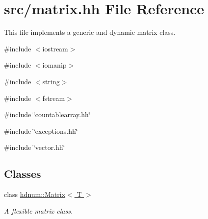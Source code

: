 \hypertarget{matrix_8hh}{
\section{src/matrix.hh File Reference}
\label{matrix_8hh}
}


This file implements a generic and dynamic matrix class.  


{\ttfamily \#include $<$iostream$>$}\par
{\ttfamily \#include $<$iomanip$>$}\par
{\ttfamily \#include $<$string$>$}\par
{\ttfamily \#include $<$fstream$>$}\par
{\ttfamily \#include \char`\"{}countablearray.hh\char`\"{}}\par
{\ttfamily \#include \char`\"{}exceptions.hh\char`\"{}}\par
{\ttfamily \#include \char`\"{}vector.hh\char`\"{}}\par
\subsection*{Classes}
\begin{DoxyCompactItemize}
\item 
class \hyperlink{classhdnum_1_1Matrix}{hdnum::Matrix$<$ T $>$}
\begin{DoxyCompactList}\small\item\em A flexible matrix class. \item\end{DoxyCompactList}\end{DoxyCompactItemize}
